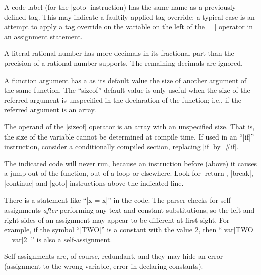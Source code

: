 {{ 
        A code label (for the |goto| instruction) has the same name as a
        previously defined tag. This may indicate a faultily applied
        tag override; a typical case is an attempt to apply a tag
        override on the variable on the left of the |=| operator in an
        assignment statement.

 
        A literal rational number has more decimals in its fractional part than
        the precision of a rational number supports. The remaining decimals
        are ignored.

 
        A function argument has a as its default value the size of another
        argument of the same function. The ``sizeof'' default value is only
        useful when the size of the referred argument is unspecified in the
        declaration of the function; i.e., if the referred argument is an
        array.

        The operand of the |sizeof| operator is an array with an unspecified
        size. That is, the size of the variable cannot be determined at compile
        time. If used in an ``|if|'' instruction, consider a conditionally
        compiled section, replacing |if| by |#if|.

 
        The indicated code will never run, because an instruction before (above)
        it causes a jump out of the function, out of a loop or elsewhere. Look
        for |return|, |break|, |continue| and |goto| instructions above the
        indicated line.

 
        There is a statement like ``|x = x|'' in the code. The parser checks
        for self assignments {\it after\/} performing any text and constant
        substitutions, so the left and right sides of an assignment may appear
        to be different at first sight. For example, if the symbol ``|TWO|'' is
        a constant with the value 2, then ``|var[TWO] = var[2]|'' is also a
        self-assignment.

        Self-assignments are, of course, redundant, and they may hide an error
        (assignment to the wrong variable, error in declaring constants).

}}
